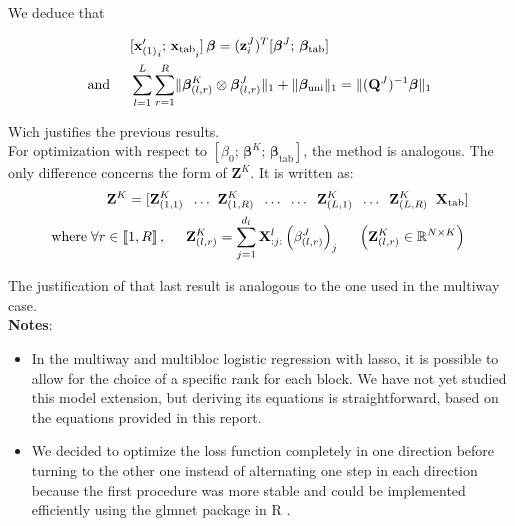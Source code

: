 \documentclass[10pt]{article}
\begin{document}
\noindent We deduce that

\begin{align}
    &[{\mathbf{x}_{\text{(1)}}'}_i; \, \mathbf{x}_{\text{tab}\raisebox{-4pt}{$\scriptstyle i$}}]\, \bm{\beta}= (\mathbf{z}_i^J)^T [\bm{\beta}^J; \, \bm{\beta}_{\text{tab}}]  \\
    \text{and} \hspace{0.5 cm} & \sum\limits_{l = 1}^L \sum\limits_{r = 1}^R \lVert \bm{\beta}_{(l,r)}^K \otimes \bm{\beta}_{(l,r)}^J \rVert_1 + \lVert \bm{\beta}_{\text{uni}} \rVert_1= \lVert (\mathbf{Q}^J)^{-1} \bm{\beta} \rVert_1
\end{align}

\noindent Wich justifies the previous results.\\[5 pt]
\noindent For optimization with respect to $\left[ \beta_0 ;\, \bm{\beta}^K ;\,  \bm{\beta}_{\text{tab}} \right]$, the method is analogous. The only difference concerns the form of $\mathbf{Z}^K$. It is written as:
\begin{align}
    \mathbf{Z}^K	=[ \mathbf{Z}_{(1,1)}^K \; \; \hdots \; \; &\mathbf{Z}_{(1,R)}^K  \; \; \hdots  \; \; \hdots \; \; \mathbf{Z}_{(L,1)}^K \; \; \hdots \; \; \mathbf{Z}_{(L,R)}^K \; \; \mathbf{X}_{\text{tab}}] \label{eqref: Z^K}\\
    \text{where} \; \forall r \in \llbracket 1, R\rrbracket\, , \hspace{0.5 cm} \mathbf{Z}_{(l,r)}^K &= \sum\limits_{j = 1}^{d_l} \mathbf{X}_{:j:}^l \left(\beta_{(l,r)}^J\right)_j \hspace{0.5 cm} \left(\mathbf{Z}_{(l,r)}^K \in \mathbb{R}^{N \times K}\right) \label{eqref: Z_tens^K}
\end{align}

\noindent The justification of that last result is analogous to the one used in the multiway case.\\[2 pt]

\noindent \textbf{Notes}: 
\begin{itemize}
\item In the multiway and multibloc logistic regression with lasso, it is possible to allow for the choice of a specific rank for each block. We have not yet studied this model extension, but deriving its equations is straightforward, based on the equations provided in this report.
\item We decided to optimize the loss function completely in one direction before turning to the other one instead of alternating one step in each direction because the first procedure was more stable and could be implemented efficiently using the glmnet package in R \cite{glmnet}. 
\end{itemize}
\end{document}
